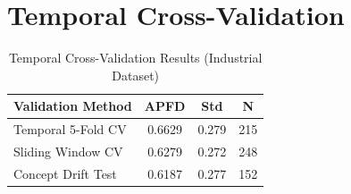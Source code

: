 \documentclass[10pt,journal,compsoc]{IEEEtran}
\begin{document}
\clearpage

\section{Temporal Cross-Validation}

\begin{table}[!t]
\centering
\caption{Temporal Cross-Validation Results (Industrial Dataset)}
\label{tab:temporal_cv}
\begin{tabular}{lccc}
\toprule
\textbf{Validation Method} & \textbf{APFD} & \textbf{Std} & \textbf{N} \\
\midrule
Temporal 5-Fold CV & 0.6629 & 0.279 & 215 \\
Sliding Window CV & 0.6279 & 0.272 & 248 \\
Concept Drift Test & 0.6187 & 0.277 & 152 \\
\bottomrule
\end{tabular}
\end{table}
\end{document}
